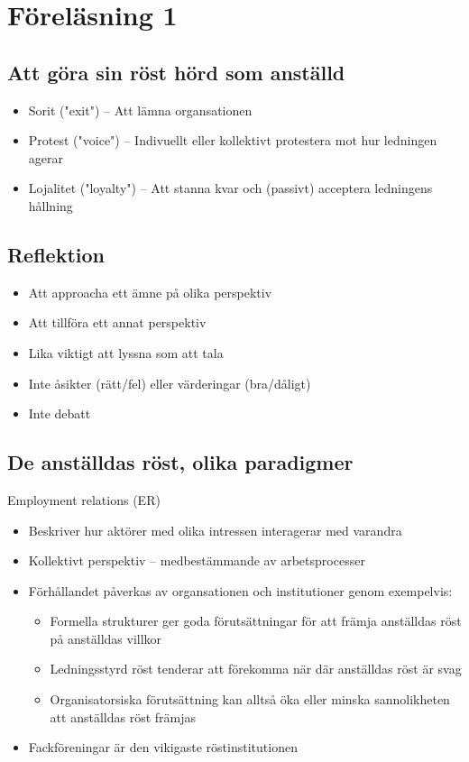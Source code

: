 \documentclass[12pt]{article}
\begin{document}
\setlength{\parindent}{0pt}
\section{Föreläsning 1}
\subsection{Att göra sin röst hörd som anställd}
\begin{itemize}
    \item Sorit ("exit") -- Att lämna organsationen
    \item Protest ("voice") -- Indivuellt eller kollektivt protestera mot hur ledningen agerar
    \item Lojalitet ("loyalty") -- Att stanna kvar och (passivt) acceptera ledningens hållning
\end{itemize}

\subsection{Reflektion}
\begin{itemize}
    \item Att approacha ett ämne på olika perspektiv 
    \item Att tillföra ett annat perspektiv
    \item Lika viktigt att lyssna som att tala
    \item Inte åsikter (rätt/fel) eller värderingar (bra/dåligt)
    \item Inte debatt
\end{itemize}

\subsection{De anställdas röst, olika paradigmer}
Employment relations (ER)
\begin{itemize}
    \item Beskriver hur aktörer med olika intressen interagerar med varandra
    \item Kollektivt perspektiv -- medbestämmande av arbetsprocesser
    \item Förhållandet påverkas av organsationen och institutioner genom exempelvis:
    \begin{itemize}
        \item Formella strukturer ger goda förutsättningar för att främja anställdas röst på anställdas villkor
        \item Ledningsstyrd röst tenderar att förekomma när där anställdas röst är svag
        \item Organisatorsiska förutsättning kan alltså öka eller minska sannolikheten att anställdas röst främjas
    \end{itemize}
    \item Fackföreningar är den vikigaste röstinstitutionen 
\end{itemize}
\end{document}
